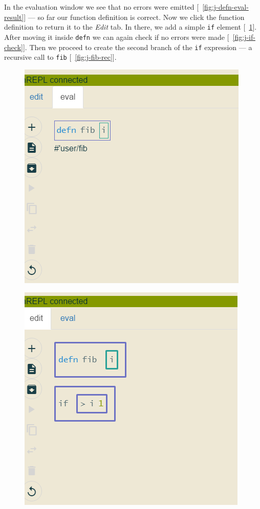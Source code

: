 \documentclass[english,mgr,shortabstract]{iithesis}
\newcommand*{\figref}[1]{[\textbf{\figurename}~\ref{#1}]}
\begin{document}
In the evaluation window we see that no errors were emitted
\figref{fig:j-defn-eval-result} --- so far our function
definition is correct.
Now we click the function definition to return it to the \textit{Edit} tab. In
there, we add a simple
\lstinline{if} element \figref{fig:j-if}.
After moving it inside \lstinline{defn} we can again check if no errors were
made \figref{fig:j-if-check}.
Then we proceed to create the second branch of the \lstinline{if} expression ---
a recursive call to \lstinline{fib} \figref{fig:j-fib-rec}.

\begin{figure}[hbt]
  \centering
  \begin{minipage}{0.48\textwidth}
    \centering
    \includegraphics[scale=0.3]{img/j-defn-eval-result}
\label{fig:j-defn-eval-result}
  \end{minipage}
  \begin{minipage}{0.48\textwidth}
    \centering
    \includegraphics[scale=0.3]{img/j-if}
\label{fig:j-if}
  \end{minipage}
\end{figure}
\end{document}
